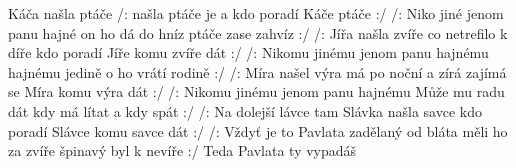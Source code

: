 \begin{TEXT}{Káča našla ptáče}
\SLOKA /:  našla ptáče je  a 
kdo poradí Káče  ptáče  :/
/: Niko jiné jenom panu hajné
on ho dá do hníz ptáče zase zahvíz :/
\SLOKA /: Jířa našla zvíře co netrefilo k díře
kdo poradí Jíře komu zvíře dát :/
/: Nikomu jinému jenom panu hajnému
hajnému jedině o ho vrátí rodině :/
\SLOKA /: Míra našel výra má po noční a zírá
zajímá se Míra komu výra dát :/
/: Nikomu jinému jenom panu hajnému
Může mu radu dát kdy má lítat a kdy spát :/
\SLOKA /: Na dolejší lávce tam Slávka našla savce
kdo poradí Slávce komu savce dát :/
/: Vždyť je to Pavlata zadělaný od bláta
měli ho za zvíře špinavý byl k nevíře :/
\INTERM Teda Pavlata ty vypadáš
\end{TEXT}